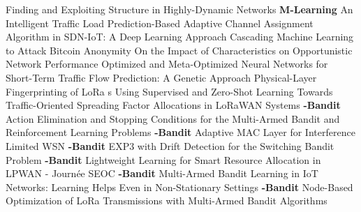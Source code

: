  \cite{casteigts_finding_nodate} Finding and {{Exploiting Structure}} in {{Highly}}-{{Dynamic Networks}} \newline 
\textbf{M-Learning} \newline  \cite{tang_intelligent_2018} An {{Intelligent Traffic Load Prediction}}-{{Based Adaptive Channel Assignment Algorithm}} in {{SDN}}-{{IoT}}: {{A Deep Learning Approach}} \newline 
 \cite{zola_cascading_2019} Cascading {{Machine Learning}} to {{Attack Bitcoin Anonymity}} \newline 
 \cite{bialon_impact_2019} On the {{Impact}} of {{ Characteristics}} on {{Opportunistic Network Performance}} \newline 
 \cite{vlahogianni_optimized_2005} Optimized and Meta-Optimized Neural Networks for Short-Term Traffic Flow Prediction: {{A}} Genetic Approach \newline 
 \cite{robyns_physical-layer_2017} Physical-Layer Fingerprinting of {{LoRa}} s Using Supervised and Zero-Shot Learning \newline 
 \cite{cuomo_towards_2018} Towards Traffic-Oriented Spreading Factor Allocations in {{LoRaWAN}} Systems \newline 
\textbf{-Bandit} \newline  \cite{even-dar_action_2006} Action {{Elimination}} and {{Stopping Conditions}} for the {{Multi}}-{{Armed Bandit}} and {{Reinforcement Learning Problems}} \newline 
\textbf{-Bandit} \newline  \cite{toldov_adaptive_2017} Adaptive {{MAC}} Layer for Interference Limited {{WSN}} \newline 
\textbf{-Bandit} \newline  \cite{allesiardo_exp3_2015} {{EXP3}} with Drift Detection for the Switching Bandit Problem \newline 
\textbf{-Bandit} \newline  \cite{noauthor_lightweight_nodate} Lightweight {{Learning}} for Smart Resource Allocation in {{LPWAN}} - {{Journée SEOC}} \newline 
\textbf{-Bandit} \newline  \cite{bonnefoi_multiarmed_2017} Multi-{{Armed Bandit Learning}} in {{IoT Networks}}: {{Learning}} Helps Even in Non-Stationary Settings \newline 
\textbf{-Bandit} \newline  \cite{kerkouche_nodebased_2018} Node-Based Optimization of {{LoRa}} Transmissions with {{Multi}}-{{Armed Bandit}} Algorithms \newline 

